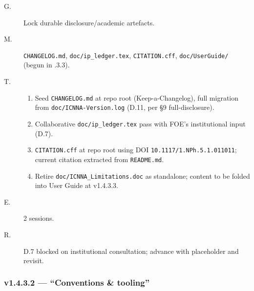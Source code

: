 \documentclass[11pt,a4paper]{article}
\begin{document}
\begin{description}
    \item[G.] Lock durable disclosure/academic artefacts.
    \item[M.] \texttt{CHANGELOG.md}, \texttt{doc/ip\_ledger.tex}, \texttt{CITATION.cff}, \texttt{doc/UserGuide/} (begun in .3.3).
    \item[T.]
        \begin{enumerate}[nosep]
            \item Seed \texttt{CHANGELOG.md} at repo root (Keep-a-Changelog), full migration from \texttt{doc/ICNNA-Version.log} (D.11, per \S9 full-disclosure).
            \item Collaborative \texttt{doc/ip\_ledger.tex} pass with FOE's institutional input (D.7).
            \item \texttt{CITATION.cff} at repo root using DOI \texttt{10.1117/1.NPh.5.1.011011}; current citation extracted from \texttt{README.md}.
            \item Retire \texttt{doc/ICNNA\_Limitations.doc} as standalone; content to be folded into User Guide at v1.4.3.3.
        \end{enumerate}
    \item[E.] 2 sessions.
    \item[R.] D.7 blocked on institutional consultation; advance with placeholder and revisit.
\end{description}

\subsubsection*{v1.4.3.2 --- ``Conventions \& tooling''}
\end{document}

